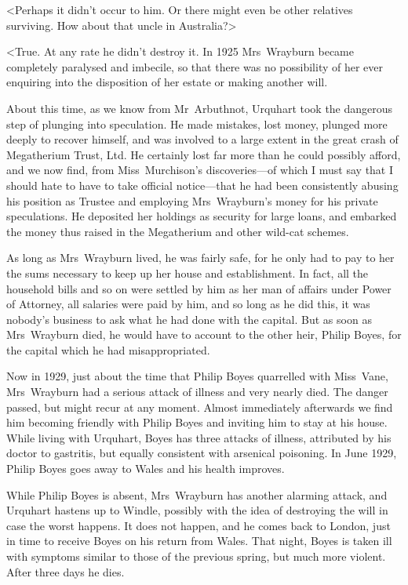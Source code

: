 <Perhaps it didn't occur to him. Or there might even be other relatives surviving. How about that uncle in Australia?>

<True. At any rate he didn't destroy it. In 1925 Mrs~Wrayburn became completely paralysed and imbecile, so that there was no possibility of her ever enquiring into the disposition of her estate or making another will.

About this time, as we know from Mr~Arbuthnot, Urquhart took the dangerous step of plunging into speculation. He made mistakes, lost money, plunged more deeply to recover himself, and was involved to a large extent in the great crash of Megatherium Trust, Ltd. He certainly lost far more than he could possibly afford, and we now find, from Miss~Murchison's discoveries—of which I must say that I should hate to have to take official notice—that he had been consistently abusing his position as Trustee and employing Mrs~Wrayburn's money for his private speculations. He deposited her holdings as security for large loans, and embarked the money thus raised in the Megatherium and other wild-cat schemes.

As long as Mrs~Wrayburn lived, he was fairly safe, for he only had to pay to her the sums necessary to keep up her house and establishment. In fact, all the household bills and so on were settled by him as her man of affairs under Power of Attorney, all salaries were paid by him, and so long as he did this, it was nobody's business to ask what he had done with the capital. But as soon as Mrs~Wrayburn died, he would have to account to the other heir, Philip Boyes, for the capital which he had misappropriated.

Now in 1929, just about the time that Philip Boyes quarrelled with Miss~Vane, Mrs~Wrayburn had a serious attack of illness and very nearly died. The danger passed, but might recur at any moment. Almost immediately afterwards we find him becoming friendly with Philip Boyes and inviting him to stay at his house. While living with Urquhart, Boyes has three attacks of illness, attributed by his doctor to gastritis, but equally consistent with arsenical poisoning. In June 1929, Philip Boyes goes away to Wales and his health improves.

While Philip Boyes is absent, Mrs~Wrayburn has another alarming attack, and Urquhart hastens up to Windle, possibly with the idea of destroying the will in case the worst happens. It does not happen, and he comes back to London, just in time to receive Boyes on his return from Wales. That night, Boyes is taken ill with symptoms similar to those of the previous spring, but much more violent. After three days he dies.

